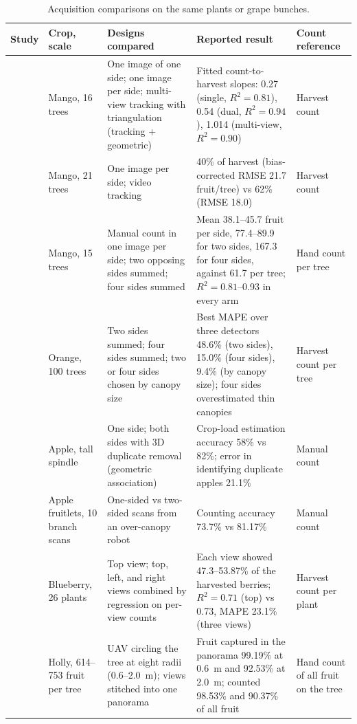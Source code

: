 \begin{table}[!t]
\centering
\caption{Acquisition comparisons on the same plants or grape bunches.}\label{tab:acq}
\footnotesize
\begin{tabularx}{\textwidth}{@{}L{2.6cm}L{1.6cm}L{2.9cm}YL{2.4cm}@{}}
\toprule
Study & Crop, scale & Designs compared & Reported result & Count reference\\
\midrule
\citet{stein2016image} & Mango, 16 trees & One image of one side; one image per side; multi-view tracking with triangulation (tracking + geometric) & Fitted count-to-harvest slopes: 0.27 (single, $R^2=0.81$), 0.54 (dual, $R^2=0.94$), 1.014 (multi-view, $R^2=0.90$) & Harvest count\\
\citet{wang2019mango} & Mango, 21 trees & One image per side; video tracking & 40\% of harvest (bias-corrected RMSE 21.7 fruit/tree) vs 62\% (RMSE 18.0) & Harvest count\\
\citet{payne2013estimation} & Mango, 15 trees & Manual count in one image per side; two opposing sides summed; four sides summed & Mean 38.1--45.7 fruit per side, 77.4--89.9 for two sides, 167.3 for four sides, against 61.7 per tree; $R^2=0.81$--0.93 in every arm & Hand count per tree\\
\citet{mirhaji2021fruit} & Orange, 100 trees & Two sides summed; four sides summed; two or four sides chosen by canopy size & Best MAPE over three detectors 48.6\% (two sides), 15.0\% (four sides), 9.4\% (by canopy size); four sides overestimated thin canopies & Harvest count per tree\\
\citet{gongal2016apple} & Apple, tall spindle & One side; both sides with 3D duplicate removal (geometric association) & Crop-load estimation accuracy 58\% vs 82\%; error in identifying duplicate apples 21.1\% & Manual count\\
\citet{qureshi2023seeing} & Apple fruitlets, 10 branch scans & One-sided vs two-sided scans from an over-canopy robot & Counting accuracy 73.7\% vs 81.17\% & Manual count\\
\citet{li2025field} & Blueberry, 26 plants & Top view; top, left, and right views combined by regression on per-view counts & Each view showed 47.3--53.87\% of the harvested berries; $R^2=0.71$ (top) vs 0.73, MAPE 23.1\% (three views) & Harvest count per plant\\
\citet{zhang2022complete} & Holly, 614--753 fruit per tree & UAV circling the tree at eight radii (0.6--2.0~m); views stitched into one panorama & Fruit captured in the panorama 99.19\% at 0.6~m and 92.53\% at 2.0~m; counted 98.53\% and 90.37\% of all fruit & Hand count of all fruit on the tree\\

\end{tabularx}
\end{table}
